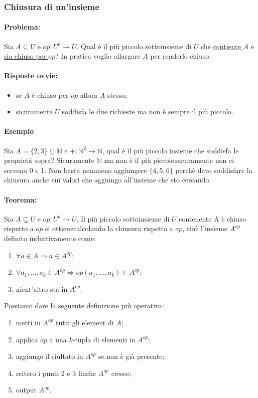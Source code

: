 \documentclass{article}
\begin{document}
\subsubsection{Chiusura di un'insieme}
\paragraph{Problema:} Sia $A \subseteq U$ e $op:U^k \rightarrow U$. Qual è il più piccolo sottoinsieme di $U$ che \underline{contiente $A$} e \underline{sia chiuso per $op$}? In pratica voglio allargare $A$ per renderlo chiuso.
\paragraph{Risposte ovvie:}
\begin{itemize}
	\item se $A$ è chiuso per $op$ allora $A$ stesso;
	\item sicuramente $U$ soddisfa le due richieste ma non è sempre il più piccolo.
\end{itemize}
\paragraph{Esempio} Sia $A=\{2,3\} \subseteq \mathbb{N}$ e $+:\mathbb{N}^2 \rightarrow \mathbb{N}$, qual è il più piccolo insieme che soddisfa le proprietà sopra? Sicuramente $\mathbb{N}$ ma non è il più piccolo:sicuramente non ci servono 0 e 1. Non basta nemmeno aggiungere $\{ 4,5,6 \}$ perchè devo soddisfare la chiusura anche sui valori che aggiungo all'insieme che sto cercando.



\paragraph{Teorema:} Sia $A \subseteq U$ e $op:U^k \rightarrow U$. Il più piccolo sottoinsieme di $U$ contenente A è chiuso rispetto a $op$ si ottienecalcolando la chiusura rispetto a $op$, cioè l'insieme $A^{op}$ definito induttivamente come:
\begin{enumerate}
	\item $\forall a \in A \Rightarrow a \in A^{op}$;
	\item $\forall a_1, \dots, a_k \in A^{op} \Rightarrow op(a_1, \dots, a_k) \in A^{op}$;
	\item nient'altro sta in $A^{op}$.
\end{enumerate}
Possiamo dare la seguente definizione più operativa:
\begin{enumerate}
	\item metti in $A^{op}$ tutti gli element di $A$;
	\item applica $op$ a una $k$-tupla di elementi in $A^{op}$;
	\item aggiungo il riultato in $A^{op}$ se non è già presente;
	\item reitero i punti 2 e 3 finche $A^{op}$ cresce;
	\item output $A^{op}$.
\end{enumerate}
\end{document}
